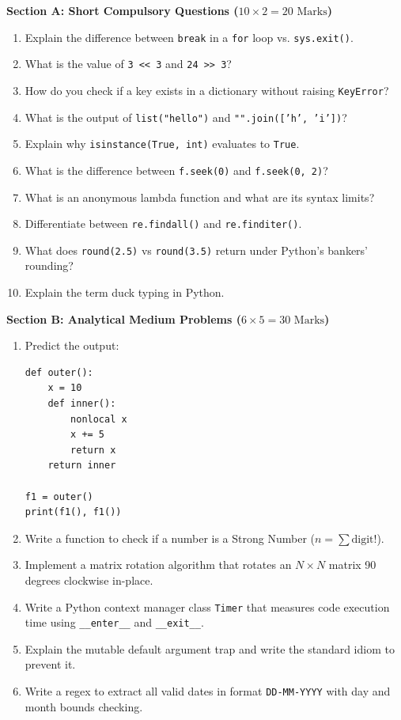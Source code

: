 \begin{mockexam}
\noindent\textbf{Section A: Short Compulsory Questions ($10 \times 2 = 20\text{ Marks}$)}
\begin{enumerate}[leftmargin=1.5em]
    \item Explain the difference between \texttt{break} in a \texttt{for} loop vs. \texttt{sys.exit()}.
    \item What is the value of \texttt{3 << 3} and \texttt{24 >> 3}?
    \item How do you check if a key exists in a dictionary without raising \texttt{KeyError}?
    \item What is the output of \texttt{list("hello")} and \texttt{"".join(['h', 'i'])}?
    \item Explain why \texttt{isinstance(True, int)} evaluates to \texttt{True}.
    \item What is the difference between \texttt{f.seek(0)} and \texttt{f.seek(0, 2)}?
    \item What is an anonymous lambda function and what are its syntax limits?
    \item Differentiate between \texttt{re.findall()} and \texttt{re.finditer()}.
    \item What does \texttt{round(2.5)} vs \texttt{round(3.5)} return under Python's bankers' rounding?
    \item Explain the term duck typing in Python.
\end{enumerate}

\medskip
\noindent\textbf{Section B: Analytical Medium Problems ($6 \times 5 = 30\text{ Marks}$)}
\begin{enumerate}[leftmargin=1.5em, start=11]
    \item Predict the output:
    \begin{lstlisting}[language=Python3]
def outer():
    x = 10
    def inner():
        nonlocal x
        x += 5
        return x
    return inner

f1 = outer()
print(f1(), f1())
    \end{lstlisting}
    \item Write a function to check if a number is a Strong Number ($n = \sum \text{digit}!$).
    \item Implement a matrix rotation algorithm that rotates an $N \times N$ matrix 90 degrees clockwise in-place.
    \item Write a Python context manager class \texttt{Timer} that measures code execution time using \texttt{\_\_enter\_\_} and \texttt{\_\_exit\_\_}.
    \item Explain the mutable default argument trap and write the standard idiom to prevent it.
    \item Write a regex to extract all valid dates in format \texttt{DD-MM-YYYY} with day and month bounds checking.
\end{enumerate}


\end{mockexam}
